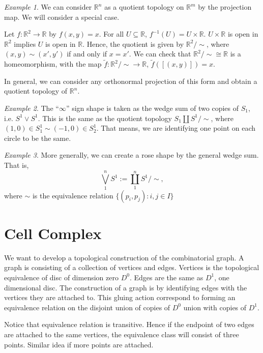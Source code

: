 \documentclass[article,11pt, reqno]{article}
\theoremstyle{remark}
\newtheorem*{example}{Example}
\newcommand{\wt}{\widetilde}
\newcommand{\mb}{\mathbb}
\newcommand{\<}{\langle}
\renewcommand{\>}{\rangle}
\begin{document}
\begin{example}
    We can consider $\mb R^n$ as a quotient topology on $\mb R^m$ by the projection map. We will consider a special case.

    Let $f:\mb R^2\rightarrow \mb R$ by $f(x,y)=x$. For all $U\subseteq\mb R$, $f^{-1}(U) = U\times \mb R$. $U\times \mb R$ is open in $\mb R^2$ implies $U$ is open in $\mb R$. Hence, the quotient is given by $\mb R^2/\sim$, where $(x,y)\sim(x', y')$ if and only if $x=x'$. We can check that $\mb R^2/\sim\cong \mb R$ is a homeomorphism, with the map $\wt f: \mb R^2/\sim\rightarrow\mb R$, $\wt f([(x,y)])=x$.

    In general, we can consider any orthonormal projection of this form and obtain a quotient topology of $\mb R^n$.
\end{example}

\begin{example}
    The ``$\infty$'' sign shape is taken as the wedge sum of two copies of $S_1$, i.e. $S^1\vee S^1$. This is the same as the quotient topology $S_1\coprod S^1/\sim$, where $(1, 0)\in S^1_1\sim (-1, 0)\in S^1_2$. That means, we are identifying one point on each circle to be the same.
\end{example}
\begin{example}
    More generally, we can create a rose shape by the general wedge sum. That is,
    $$\bigvee_1^n S^1:= \coprod_1^n S^1/\sim,$$
    where $\sim$ is the equivalence relation $\{(p_i, p_j):i,j\in I\}$
\end{example}

\section{Cell Complex}
We want to develop a topological construction of the combinatorial graph.
A graph is consisting of a collection of vertices and edges. Vertices is the topological equivalence of disc of dimension zero $D^0$. Edges are the same as $D^1$, one dimensional disc. The construction of a graph is by identifying edges with the vertices they are attached to. This gluing action correspond to forming an equivalence relation on the disjoint union of copies of $D^0$ union with copies of $D^1$.

Notice that equivalence relation is transitive. Hence if the endpoint of two edges are attached to the same vertices, the equivalence class will consist of three points. Similar idea if more points are attached.
\end{document}
